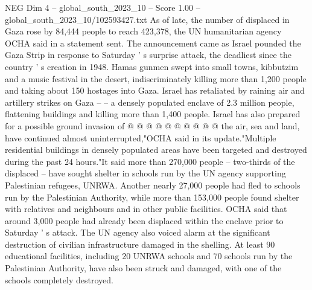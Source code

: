 \begin{textsample}{NEG Dim 4 – global\_south\_2023\_10 – Score 1.00 – global\_south\_2023\_10/102593427.txt}
As of late, the number of displaced in Gaza rose by 84,444 people to reach 423,378, the UN humanitarian agency OCHA said in a statement sent.
The announcement came as Israel pounded the Gaza Strip in response to Saturday ' s surprise attack, the deadliest since the country ' s creation in 1948.
Hamas gunmen swept into small towns, kibbutzim and a music festival in the desert, indiscriminately killing more than 1,200 people and taking about 150 hostages into Gaza.
Israel has retaliated by raining air and artillery strikes on Gaza -- -- a densely populated enclave of 2.3 million people, flattening buildings and killing more than 1,400 people.
Israel has also prepared for a possible ground invasion of @ @ @ @ @ @ @ @ @ @ the air, sea and land, have continued almost uninterrupted,"OCHA said in its update."Multiple residential buildings in densely populated areas have been targeted and destroyed during the past 24 hours."It said more than 270,000 people -- two-thirds of the displaced -- have sought shelter in schools run by the UN agency supporting Palestinian refugees, UNRWA.
Another nearly 27,000 people had fled to schools run by the Palestinian Authority, while more than 153,000 people found shelter with relatives and neighbours and in other public facilities.
OCHA said that around 3,000 people had already been displaced within the enclave prior to Saturday ' s attack.
The UN agency also voiced alarm at the significant destruction of civilian infrastructure damaged in the shelling.
At least 90 educational facilities, including 20 UNRWA schools and 70 schools run by the Palestinian Authority, have also been struck and damaged, with one of the schools completely destroyed.

\end{textsample}
